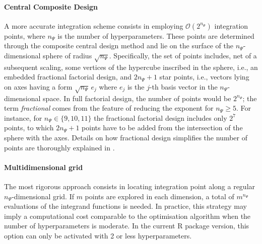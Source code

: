 \documentclass[openany, 11pt, oneside]{book}
\begin{document}
\paragraph{Central Composite Design}
A more accurate integration scheme consists in employing $\mathcal{O}\left(2^{n_\Psi} \right)$ integration points, where $n_\Psi$ is the number of hyperparameters. These points are determined through the composite central design method and lie on the surface of the $n_\Psi$-dimensional sphere of radius $\sqrt{n_\Psi}$. Specifically, the set of points includes, net of a subsequent scaling, some vertices of the hypercube inscribed in the sphere, i.e., an embedded fractional factorial design, and $2n_\Psi+1$ star points, i.e., vectors lying on axes having a form $ \sqrt{n_\Psi} \, e_j$ where $e_j$ is the $j$-th basis vector in the $n_\Psi$-dimensional space. In full factorial design, the number of points would be $2^{n_\Psi}$; the term \textit{fractional} comes from the feature of reducing the exponent for $n_\Psi\geq5$. For instance, for $n_\Psi \in \lbrace 9, 10, 11\rbrace$ the fractional factorial design includes only $2^7$ points, to which $2 n_\Psi+1$ points have to be added from the intersection of the sphere with the axes. Details on how fractional design simplifies the number of points are thoroughly explained in \cite{Sanchez_FFD}.

\paragraph{Multidimensional grid}
The most rigorous approach consists in locating integration point along a regular $n_\Psi$-dimensional grid. If $m$ points are explored in each dimension, a total of $m^{n_\Psi}$ evaluations of the integrand functions is needed. In practice, this strategy may imply a computational cost comparable to the optimisation algorithm when the number of hyperparameters is moderate. In the current R package version, this option can only be activated with 2 or less hyperparameters. 


\end{document}
